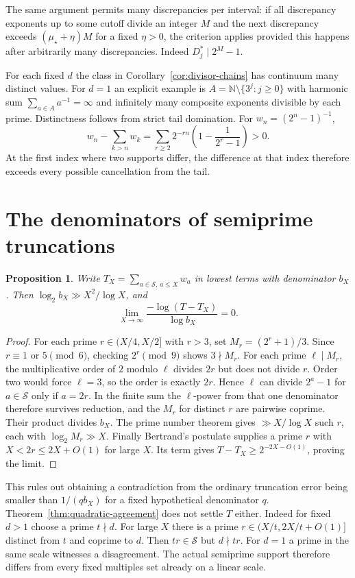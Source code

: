 \documentclass[11pt,letterpaper]{article}
\newtheorem{proposition}[theorem]{Proposition}
\begin{document}
The same argument permits many discrepancies per interval:
if all discrepancy exponents up to some cutoff divide an integer $M$
and the next discrepancy exceeds $(\mu_\star+\eta)M$
for a fixed $\eta>0$, the criterion applies provided this happens
after arbitrarily many discrepancies. Indeed $D_j^*\mid 2^M-1$.

For each fixed $d$ the class in Corollary~\ref{cor:divisor-chains} has continuum many distinct values. For $d=1$ an explicit example is
$A=\mathbb N\setminus\{3^j:j\ge0\}$ with harmonic sum
$\sum_{a\in A}a^{-1}=\infty$ and infinitely many composite exponents
divisible by each prime. Distinctness follows from strict tail
domination. For $w_n=(2^n-1)^{-1}$,
\[
 w_n-\sum_{k>n}w_k
 =\sum_{r\ge2}2^{-rn}\left(1-\frac1{2^r-1}\right)>0.
\]
At the first index where two supports differ, the difference at
that index therefore exceeds every possible cancellation from the tail.

\section{The denominators of semiprime truncations}

\begin{proposition}
Write $T_X=\sum_{a\in\mathcal S,\,a\le X}w_a$ in lowest terms with denominator $b_X$. Then $\log_2 b_X\gg X^2/\log X$, and
\[
 \lim_{X\to\infty}\frac{-\log(T-T_X)}{\log b_X}=0 .
\]
\end{proposition}
\begin{proof}
For each prime $r\in(X/4,X/2]$ with $r>3$, set $M_r=(2^r+1)/3$. Since $r\equiv1$ or $5\pmod6$, checking $2^r\pmod9$ shows $3\nmid M_r$. For each prime $\ell\mid M_r$, the multiplicative order of $2$ modulo $\ell$ divides $2r$ but does not divide $r$. Order two would force $\ell=3$, so the order is exactly $2r$. Hence $\ell$ can divide $2^a-1$ for $a\in\mathcal S$ only if $a=2r$. In the finite sum the $\ell$-power from that one denominator therefore survives reduction, and the $M_r$ for distinct $r$ are pairwise coprime. Their product divides $b_X$. The prime number theorem gives $\gg X/\log X$ such $r$, each with $\log_2 M_r\gg X$. Finally Bertrand's postulate supplies a prime $r$ with $X<2r\le 2X+O(1)$ for large $X$. Its term gives $T-T_X\ge2^{-2X-O(1)}$, proving the limit.
\end{proof}

This rules out obtaining a contradiction from the ordinary truncation error being smaller than $1/(qb_X)$ for a fixed hypothetical denominator $q$. Theorem~\ref{thm:quadratic-agreement} does not settle $T$ either. Indeed for fixed $d>1$ choose a prime $t\nmid d$. For large $X$ there is a prime $r\in(X/t,2X/t+O(1)]$ distinct from $t$ and coprime to $d$. Then $tr\in\mathcal S$ but $d\nmid tr$. For $d=1$ a prime in the same scale witnesses a disagreement. The actual semiprime support therefore differs from every fixed multiples set already on a linear scale.
\end{document}
